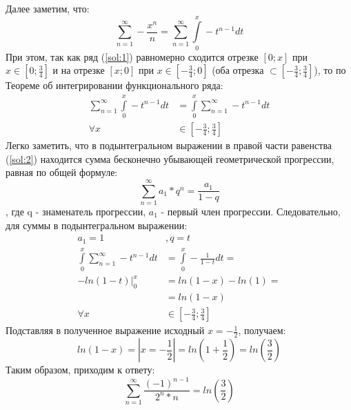 \documentclass[12pt, a4paper]{article}
\begin{document}
Далее заметим, что:
\begin{equation*}
\sum_{n=1}^{\infty}-\frac{x^n}{n} = \sum_{n=1}^{\infty}\int\limits_{0}^x -t^{n-1} dt
\end{equation*}
При этом, так как ряд (\ref{sol:1}) равномерно сходится отрезке $\left[0;x\right]$ при $x \in \left[0;\frac{3}{4}\right]$ и на отрезке $\left[x;0\right]$ при $x \in \left[-\frac{3}{4};0\right]$ (оба отрезка $\subset \left[-\frac{3}{4};\frac{3}{4}\right]$), то по Теореме об интегрировании функционального ряда:
\begin{equation}\label{sol:2}
\begin{aligned}
 \sum_{n=1}^{\infty}\int\limits_{0}^x -t^{n-1} dt &= \int\limits_{0}^x\sum_{n=1}^{\infty} -t^{n-1} dt\\
  \forall x &\in \left[-\frac{3}{4};\frac{3}{4}\right]
\end{aligned}
\end{equation}
Легко заметить, что в подынтегральном выражении в правой части равенства (\ref{sol:2}) находится сумма бесконечно убывающей геометрической прогрессии, равная по общей формуле:
\begin{equation*}
 \sum_{n=1}^{\infty}a_1 * q^n = \frac{a_1}{1-q}
\end{equation*},
где q - знаменатель прогрессии, $a_1$ - первый член прогрессии. Следовательно, для суммы в подынтегральном выражении:
\begin{equation}\label{sol:3}
\begin{aligned}
a_1 = 1 &, q=t\\
\int\limits_{0}^x\sum_{n=1}^{\infty} -t^{n-1} dt &= \int\limits_{0}^x -\frac{1}{1-t} dt =\\
\left.-ln(1-t)\right|_0^x &= ln(1-x) - ln(1)=\\
&= ln(1-x)\\
  \forall x &\in \left[-\frac{3}{4};\frac{3}{4}\right]
\end{aligned}
\end{equation}
Подставляя в полученное выражение исходный $x=-\frac{1}{2}$, получаем:
\begin{equation*}
ln(1-x)= \left|x=-\frac{1}{2}\right| = ln\left(1+\frac{1}{2}\right)=ln\left(\frac{3}{2}\right)
\end{equation*}
Таким образом, приходим к ответу:
\begin{equation*}
 \sum_{n=1}^{\infty}\frac{\left(-1\right)^{n-1}}{2^n * n} = ln\left(\frac{3}{2}\right)
\end{equation*}
\end{document}
